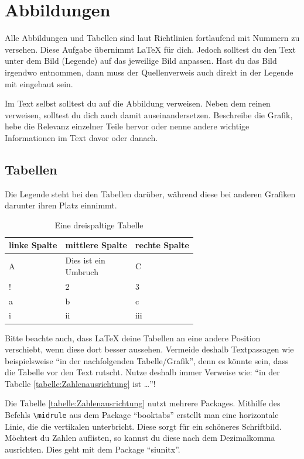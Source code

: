 \chapter{Abbildungen}
Alle Abbildungen und Tabellen sind laut Richtlinien fortlaufend mit Nummern zu versehen. Diese Aufgabe übernimmt \LaTeX{} für dich. Jedoch solltest du den Text unter dem Bild (Legende) auf das jeweilige Bild anpassen. Hast du das Bild irgendwo entnommen, dann muss der Quellenverweis auch direkt in der Legende mit eingebaut sein.

Im Text selbst solltest du auf die Abbildung verweisen. Neben dem reinen verweisen, solltest du dich auch damit auseinandersetzen. Beschreibe die Grafik, hebe die Relevanz einzelner Teile hervor oder nenne andere wichtige Informationen im Text davor oder danach.

\section{Tabellen}
Die Legende steht bei den Tabellen darüber, während diese bei anderen Grafiken darunter ihren Platz einnimmt.

\begin{table}[ht]
	\centering
	\caption{Eine dreispaltige Tabelle}
	\begin{tabular}{lll}
		\toprule
		\textbf{linke Spalte} & \textbf{mittlere Spalte} & \textbf{rechte Spalte} \\
		\midrule
		A & \makecell{Dies ist ein \\ Umbruch} & C \\
		! & 2 & 3 \\
		a & b & c \\
		i & ii & iii \\
		\bottomrule
	\end{tabular}
	\label{tabelle:Einfache3Spalten}
\end{table}

Bitte beachte auch, dass \LaTeX{} deine Tabellen an eine andere Position verschiebt, wenn diese dort besser aussehen. Vermeide deshalb Textpassagen wie beispielsweise \enquote{in der nachfolgenden Tabelle/Grafik}, denn es könnte sein, dass die Tabelle vor den Text rutscht. Nutze deshalb immer Verweise wie: \enquote{in der Tabelle \ref{tabelle:Zahlenausrichtung} ist \dots }!

Die Tabelle \ref{tabelle:Zahlenausrichtung} nutzt mehrere Packages. Mithilfe des Befehls \texttt{\textbackslash midrule} aus dem Package \enquote{booktabs} erstellt man eine horizontale Linie, die die vertikalen unterbricht. Diese sorgt für ein schöneres Schriftbild. Möchtest du Zahlen auflisten, so kannst du diese nach dem Dezimalkomma ausrichten. Dies geht mit dem Package \enquote{siunitx}.

